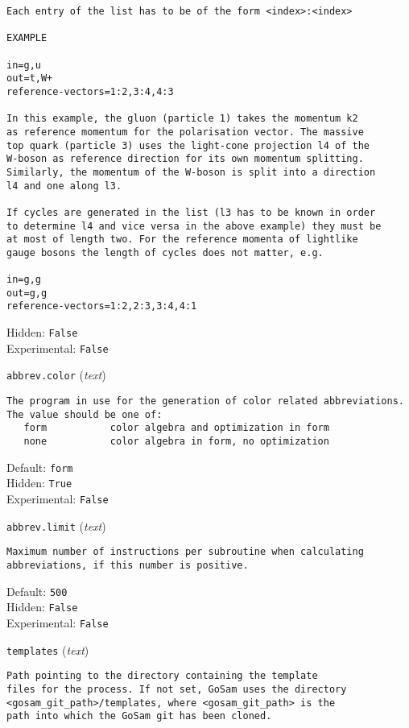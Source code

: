 \begin{basedescript}{\desclabelstyle{\pushlabel}}
\begin{verbatim}
Each entry of the list has to be of the form <index>:<index>

EXAMPLE

in=g,u
out=t,W+
reference-vectors=1:2,3:4,4:3

In this example, the gluon (particle 1) takes the momentum k2
as reference momentum for the polarisation vector. The massive
top quark (particle 3) uses the light-cone projection l4 of the
W-boson as reference direction for its own momentum splitting.
Similarly, the momentum of the W-boson is split into a direction
l4 and one along l3.

If cycles are generated in the list (l3 has to be known in order
to determine l4 and vice versa in the above example) they must be
at most of length two. For the reference momenta of lightlike
gauge bosons the length of cycles does not matter, e.g.

in=g,g
out=g,g
reference-vectors=1:2,2:3,3:4,4:1
\end{verbatim}
Hidden: \verb|False|
\\Experimental: \verb|False|
\\\item[\colorbox{gray!30}{\texttt{abbrev.color}}] (\textit{text})
\begin{verbatim}
The program in use for the generation of color related abbreviations.
The value should be one of:
   form           color algebra and optimization in form
   none           color algebra in form, no optimization
\end{verbatim}
Default: \verb|form|
\\Hidden: \verb|True|
\\Experimental: \verb|False|
\\\item[\colorbox{gray!30}{\texttt{abbrev.limit}}] (\textit{text})
\begin{verbatim}
Maximum number of instructions per subroutine when calculating
abbreviations, if this number is positive.
\end{verbatim}
Default: \verb|500|
\\Hidden: \verb|False|
\\Experimental: \verb|False|
\\\item[\colorbox{gray!30}{\texttt{templates}}] (\textit{text})
\begin{verbatim}
Path pointing to the directory containing the template
files for the process. If not set, GoSam uses the directory
<gosam_git_path>/templates, where <gosam_git_path> is the
path into which the GoSam git has been cloned.


\end{verbatim}
\end{basedescript}
